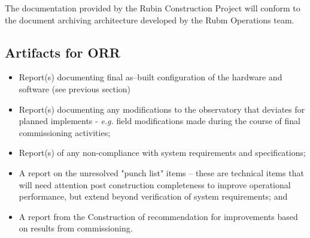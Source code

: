 The documentation provided by the Rubin Construction Project will conform to the document archiving architecture developed by the Rubm Operations team.

\subsection{Artifacts for ORR}

\begin{itemize}

	\item Report(s) documenting final as--built configuration of the hardware and software (see previous section)
	\item Report(s) documenting any modifications to the observatory that deviates for planned implements - {\it e.g.} field modifications made during the course of final commissioning activities;
	\item Report(s) of any non-compliance with system requirements and specifications;
	\item A report on the unresolved "punch list" items -- these are technical items that will need attention post construction completeness to improve operational performance, but extend beyond verification of system requirements; and
	\item A report from the Construction of recommendation for improvements based on results from commissioning.
	
\end{itemize}
